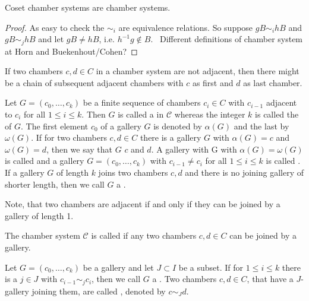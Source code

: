 \begin{lemm}
	Coset chamber systems are chamber systems.

	\begin{proof}
		As easy to check the $\sim_i$ are equivalence relations. So suppose $gB \sim_i hB$ and $gB \sim_j hB$ and let $gB \neq hB$, i.e. $h^{-1}g \notin B$. \todo \ Different definitions of chamber system at Horn and Buekenhout/Cohen?
	\end{proof}
\end{lemm}

If two chambers $c,d \in C$ in a chamber system are not adjacent, then there might be a chain of subsequent adjacent chambers with $c$ as first and $d$ as last chamber.

\begin{defi}
	Let $G = (c_0,\ldots,c_k)$ be a finite sequence of chambers $c_i \in C$ with $c_{i-1}$ adjacent to $c_i$ for all $1 \leq i \leq k$. Then $G$ is called a  in $\mathcal{C}$ whereas the integer $k$ is called the  of $G$. The first element $c_0$ of a gallery $G$ is denoted by $\alpha(G)$ and the last by $\omega(G)$. If for two chambers $c,d \in C$ there is a gallery $G$ with $\alpha(G) = c$ and $\omega(G) = d$, then we say that $G$  $c$ and $d$. A gallery with G with $\alpha(G) = \omega(G)$ is called  and a gallery $G = (c_0,\ldots,c_k)$ with $c_{i-1} \neq c_i$ for all $1 \leq i \leq k$ is called . If a gallery $G$ of length $k$ joins two chambers $c,d$ and there is no joining gallery of shorter length, then we call $G$ a .
\end{defi}

Note, that two chambers are adjacent if and only if they can be joined by a gallery of length 1.

\begin{defi}
	The chamber system $\mathcal{C}$ is called  if any two chambers $c,d \in C$ can be joined by a gallery.
\end{defi}

\begin{defi}
	Let $G = (c_0,\ldots,c_k)$ be a gallery and let $J \subset I$ be a subset. If for $1 \leq i \leq k$ there is a $j \in J$ with $c_{i-1} \sim_j c_i$, then we call $G$ a . Two chambers $c,d \in C$, that have a $J$-gallery joining them, are called , denoted by $c \sim_J d$.
\end{defi}

